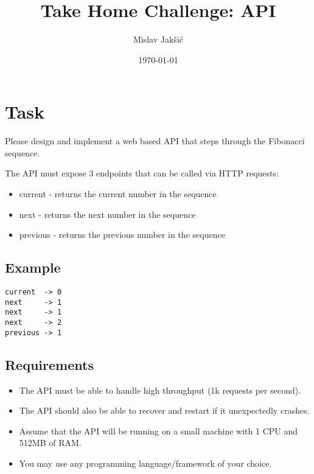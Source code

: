 \documentclass{article}
\title{Take Home Challenge: API}
\author{Mislav Jakšić}
\date{\today}
\begin{document}
\maketitle

\section{Task}

Please design and implement a web based API that steps through the Fibonacci sequence.

The API must expose 3 endpoints that can be called via HTTP requests:
\begin{itemize}
  \item current - returns the current number in the sequence
  \item next - returns the next number in the sequence
  \item previous - returns the previous number in the sequence
\end{itemize}


\subsection{Example}

\begin{lstlisting}
current  -> 0
next     -> 1
next     -> 1
next     -> 2
previous -> 1
\end{lstlisting}


\subsection{Requirements}

\begin{itemize}
  \item The API must be able to handle high throughput (1k requests per second).
  \item The API should also be able to recover and restart if it unexpectedly crashes.
  \item Assume that the API will be running on a small machine with 1 CPU and 512MB of RAM.
  \item You may use any programming language/framework of your choice.
\end{itemize}
\end{document}
